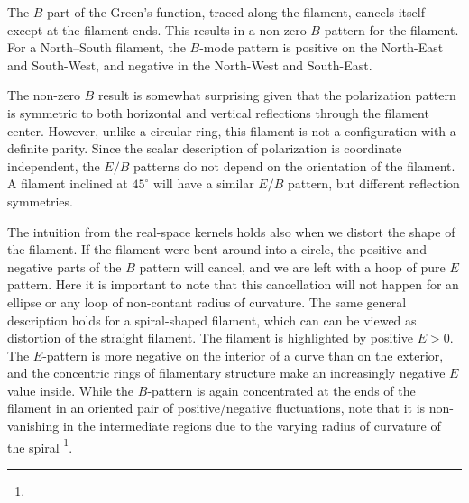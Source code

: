 The $B$ part of the Green's function, traced along the filament, cancels itself except at the filament ends.  This results in a non-zero $B$ pattern for the filament.  For a North--South filament, the $B$-mode pattern is positive on the North-East and South-West, and negative in the North-West and South-East.

The non-zero $B$ result is somewhat surprising given that the polarization pattern is symmetric to both horizontal and vertical reflections through the filament center.  However, unlike a circular ring, this filament is not a configuration with a definite parity.  Since the scalar description of polarization is coordinate independent, the $E/B$ patterns do not depend on the orientation of the filament.  A filament inclined at $45^\circ$ will have a similar $E/B$ pattern, but different reflection symmetries.  

The intuition from the real-space kernels holds also when we distort the shape of the filament.  If the filament were bent around into a circle, the positive and negative parts of the $B$ pattern will cancel, and we are left with a hoop of pure $E$ pattern. Here it is important to note that this cancellation will not happen for an ellipse or any loop of non-contant radius of curvature.  The same general description holds for a spiral-shaped filament, which can can be viewed as distortion of the straight filament.  The filament is highlighted by positive $E>0$.  The $E$-pattern is more negative on the interior of a curve than on the exterior, and the concentric rings of filamentary structure make an increasingly negative $E$ value inside. While the $B$-pattern is again concentrated at the ends of the filament in an oriented pair of positive/negative fluctuations, note that it is non-vanishing in the intermediate regions due to the varying radius of curvature of the spiral \footnote{ }. 


